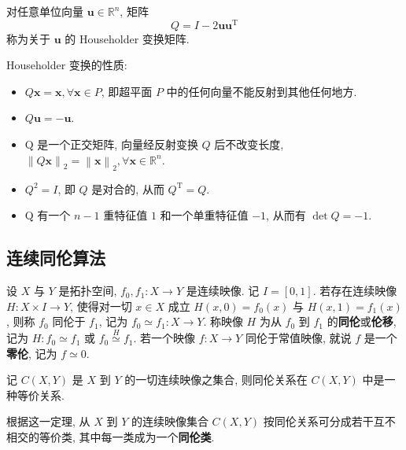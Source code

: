 \begin{definition}
  对任意单位向量 \(\boldsymbol{u}\in\mathbb{R}^n\), 矩阵
  \begin{equation*}
    Q=I-2\boldsymbol{u}\boldsymbol{u}^\mathrm{T}
  \end{equation*}
  称为关于 \(\boldsymbol{u}\) 的 Householder 变换矩阵.
\end{definition}

Householder 变换的性质:

\begin{itemize}
  \item \(Q\boldsymbol{x}=\boldsymbol{x},\forall\boldsymbol{x}\in P\), 即超平面 \(P\) 中的任何向量不能反射到其他任何地方.
  \item \(Q\boldsymbol{u}=-\boldsymbol{u}\).
  \item Q 是一个正交矩阵, 向量经反射变换 \(Q\) 后不改变长度, \(\left\lVert Q\boldsymbol{x}\right\rVert_2=\left\lVert \boldsymbol{x}\right\rVert_2,\forall\boldsymbol{x}\in\mathbb{R}^n\).
  \item \(Q^2=I\), 即 \(Q\) 是对合的, 从而 \(Q^\mathrm{T}=Q\).
  \item Q 有一个 \(n-1\) 重特征值 \(1\) 和一个单重特征值 \(-1\), 从而有 \(\det Q=-1\).
\end{itemize}

\subsection{连续同伦算法}

\begin{definition}
  设 \(X\) 与 \(Y\) 是拓扑空间, \(f_0,f_1:X\to Y\) 是连续映像. 记 \(I=[0,1]\). 若存在连续映像 \(H:X\times I\to Y\), 使得对一切 \(x\in X\) 成立 \(H(x,0)=f_0(x)\) 与 \(H(x,1)=f_1(x)\), 则称 \(f_0\) 同伦于 \(f_1\), 记为 \(f_0\simeq f_1:X\to Y\). 称映像 \(H\) 为从 \(f_0\) 到 \(f_1\) 的\textbf{同伦}或\textbf{伦移}, 记为 \(H:f_0\simeq f_1\) 或 \(f_0 \overset{H}{\simeq} f_1\). 若一个映像 \(f:X\to Y\) 同伦于常值映像, 就说 \(f\) 是一个\textbf{零伦}, 记为 \(f\simeq 0\).
\end{definition}

\begin{theorem}
  记 \(C(X,Y)\) 是 \(X\) 到 \(Y\) 的一切连续映像之集合, 则同伦关系在 \(C(X,Y)\) 中是一种等价关系.
\end{theorem}

根据这一定理, 从 \(X\) 到 \(Y\) 的连续映像集合 \(C(X,Y)\) 按同伦关系可分成若干互不相交的等价类, 其中每一类成为一个\textbf{同伦类}.

